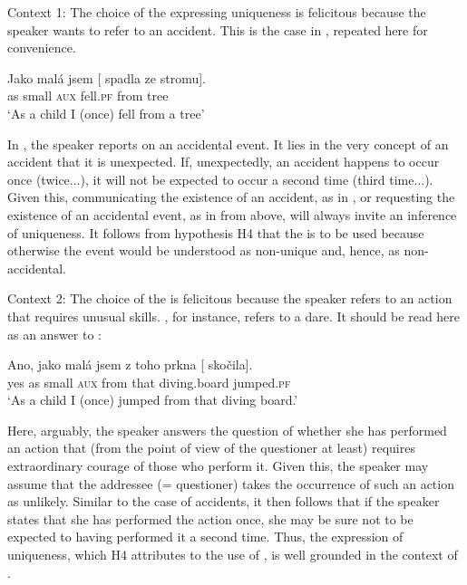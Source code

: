 \documentclass[output=paper,modfonts,newtxmath,hidelinks]{langscibook}
\begin{document}
Context 1: The choice of the  expressing uniqueness is felicitous because the speaker wants to refer to an accident. This is the case in , repeated here for convenience.  
 
\begin{exe}
\ex\label{13:baumrep}
\gll Jako mal\'a jsem [ spadla ze stromu]. \\
as small \textsc{aux} {} fell.\textsc{pf} from tree\\
\glt `As a child I (once) fell from a tree' 
\end{exe}

\noindent In , the speaker reports on an accidental event. It lies in the very concept of an accident that it is unexpected.  
If, unexpectedly, an accident happens to occur once (twice...), it will not be expected to occur a second time (third time...).  
Given this, communicating the existence of an accident, as in , or requesting the existence of an accidental event, as in  from above, will always invite an inference of uniqueness. It follows from hypothesis H4 that the  is to be used because otherwise the event would be understood as non-unique and, hence, as non-accidental.

Context 2: The choice of the  is felicitous because the speaker refers to an action that requires unusual skills. , for instance, refers to a dare. It should be read here as an answer to :

\begin{exe}
\ex\label{13:prknarep}
\gll Ano, jako mal\'a jsem z toho prkna [ sko\v{c}ila].\\
yes as small \textsc{aux} from that diving.board {} jumped.\textsc{pf} \\
\glt `As a child I (once) jumped from that diving board.'
\end{exe}

\noindent Here, arguably, the speaker answers the question of whether she has performed an action that (from the point of view of the questioner at least) requires extraordinary courage of those who perform it. 
Given this, the speaker may assume that the addressee (= questioner) takes the occurrence of such an action as unlikely. 
Similar to the case of accidents, it then follows that if the speaker states that she has performed the action once, she may be sure not to be expected to having performed it a second time. Thus, the expression of uniqueness, which H4 attributes to the use of , is well grounded in the context of .
\end{document}
